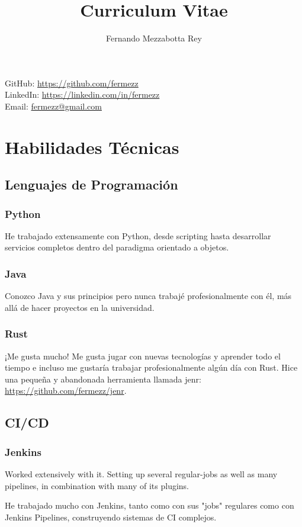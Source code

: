 \documentclass{article}
\makeatletter
\renewcommand{\maketitle}
{\begin{center}
{\huge\bfseries
\theauthor}

\vspace{.5em}

GitHub: \url{https://github.com/fermezz}\\LinkedIn: \url{https://linkedin.com/in/fermezz}\\Email: \url{fermezz@gmail.com}

\end{center}}
\makeatother
\begin{document}
\title{Curriculum Vitae}
\author{Fernando Mezzabotta Rey}

\maketitle

\section{Habilidades Técnicas}
\subsection{Lenguajes de Programación}
\subsubsection{Python}
  \begin{description}
    \item He trabajado extensamente con Python, desde scripting hasta desarrollar servicios completos dentro del paradigma orientado a objetos.
  \end{description}
\subsubsection{Java}
  \begin{description}
    \item Conozco Java y sus principios pero nunca trabajé profesionalmente con él, más allá de hacer proyectos en la universidad.
  \end{description}
\subsubsection{Rust}
  \begin{description}
    \item ¡Me gusta mucho! Me gusta jugar con nuevas tecnologías y aprender todo el tiempo e incluso me gustaría trabajar profesionalmente algún día con Rust. Hice una pequeña y abandonada herramienta llamada jenr: \url{https://github.com/fermezz/jenr}.
  \end{description}
\subsection{CI/CD}
\subsubsection{Jenkins}
  \begin{description}
    \item Worked extensively with it. Setting up several regular-jobs as well as many pipelines, in combination with many of its plugins.
    \item He trabajado mucho con Jenkins, tanto como con sus "jobs" regulares como con Jenkins Pipelines, construyendo sistemas de CI complejos.
  \end{description}
\end{document}
